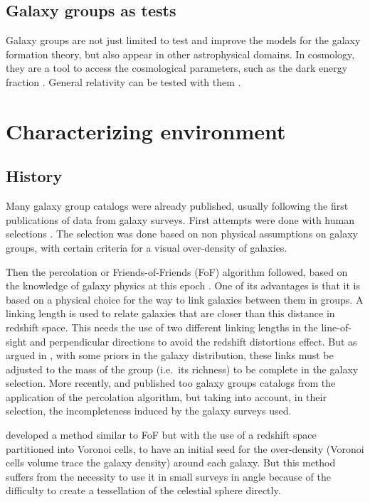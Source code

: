 \subsection{Galaxy groups as tests}
\label{sub:galaxy_groups_as_tests}

Galaxy groups are not just limited to test and improve the models for the
galaxy formation theory, but also appear in other astrophysical domains. In
cosmology, they are a tool to access the cosmological parameters, such as
the dark energy fraction \citep{Wang+98}. General relativity can be tested
with them \citep{Wojtak+11}. 

\section{Characterizing environment}
\label{sec:characterizing_environment}

\subsection{History}
\label{sub:history}

Many galaxy group catalogs were already published, usually following the
first publications of data from galaxy surveys. First attempts were done
with human selections \citep{Abell+58,Zwicky+61,Rose+76}. The selection was
done based on non physical assumptions on galaxy groups, with certain
criteria for a visual over-density of galaxies.

Then the percolation or Friends-of-Friends (FoF) algorithm followed, based
on the knowledge of galaxy physics at this epoch
\citep{Huchra+82,Nolthenius+87}. One of its advantages is that it is based
on a physical choice for the way to link galaxies between them in groups. A
linking length is used to relate galaxies that are closer than this distance
in redshift space. This needs the use of two different linking lengths in
the line-of-sight and perpendicular directions to avoid the redshift
distortions effect. But as argued in \citet{DM+14a}, with some priors in the
galaxy distribution, these links must be adjusted to the mass of the group
(i.e.\ its richness) to be complete in the galaxy selection. More recently,
\citet{Eke+04} and \citet{Berlind+06} published too galaxy groups catalogs
from the application of the percolation algorithm, but taking into account,
in their selection, the incompleteness induced by the galaxy surveys used.

\citet{Marinoni+02} developed a method similar to FoF but with the use of a
redshift space partitioned into Voronoi cells, to have an initial seed for
the over-density (Voronoi cells volume trace the galaxy density) around each
galaxy. But this method suffers from the necessity to use it in small
surveys in angle because of the difficulty to create a tessellation of the
celestial sphere directly.


